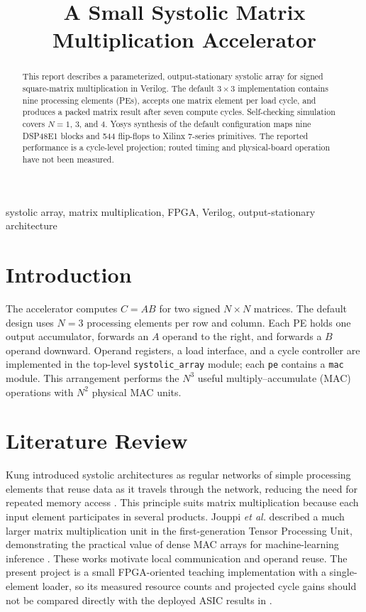 \documentclass[conference]{IEEEtran}
\title{A Small Systolic Matrix Multiplication Accelerator}
\author{\IEEEauthorblockN{Pihu Jaitly \and Ritik Raj}}
\begin{document}
\maketitle

\begin{abstract}
This report describes a parameterized, output-stationary systolic array for signed square-matrix multiplication in Verilog. The default $3\times3$ implementation contains nine processing elements (PEs), accepts one matrix element per load cycle, and produces a packed matrix result after seven compute cycles. Self-checking simulation covers $N=1$, 3, and 4. Yosys synthesis of the default configuration maps nine DSP48E1 blocks and 544 flip-flops to Xilinx 7-series primitives. The reported performance is a cycle-level projection; routed timing and physical-board operation have not been measured.
\end{abstract}

\begin{IEEEkeywords}
systolic array, matrix multiplication, FPGA, Verilog, output-stationary architecture
\end{IEEEkeywords}

\section{Introduction}
The accelerator computes $C=AB$ for two signed $N\times N$ matrices. The default design uses $N=3$ processing elements per row and column. Each PE holds one output accumulator, forwards an $A$ operand to the right, and forwards a $B$ operand downward. Operand registers, a load interface, and a cycle controller are implemented in the top-level \texttt{systolic\_array} module; each \texttt{pe} contains a \texttt{mac} module. This arrangement performs the $N^3$ useful multiply--accumulate (MAC) operations with $N^2$ physical MAC units.

\section{Literature Review}
Kung introduced systolic architectures as regular networks of simple processing elements that reuse data as it travels through the network, reducing the need for repeated memory access \cite{kung1982}. This principle suits matrix multiplication because each input element participates in several products. Jouppi \emph{et al.} described a much larger matrix multiplication unit in the first-generation Tensor Processing Unit, demonstrating the practical value of dense MAC arrays for machine-learning inference \cite{jouppi2017}. These works motivate local communication and operand reuse. The present project is a small FPGA-oriented teaching implementation with a single-element loader, so its measured resource counts and projected cycle gains should not be compared directly with the deployed ASIC results in \cite{jouppi2017}.
\end{document}
